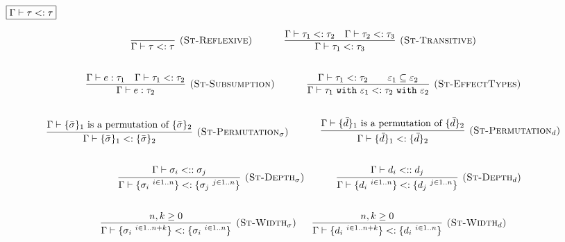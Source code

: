 \documentclass{llncs}
\newcommand{\keywadj}[1]{\mathtt{#1}}
\newcommand{\keyw}[1]{\keywadj{#1}~}
\newcommand{\type}[2]{
	#1~\keyw{with} #2
}
\begin{document}
\noindent
$\fbox{$\Gamma \vdash \tau <: \tau$}$

\[
\begin{array}{c}

\infer[\textsc{(St-Reflexive)}]
	{\Gamma \vdash \tau <: \tau}
	{}
	
~~~~~~~~~~

	\infer[\textsc{(St-Transitive)}]
	{\Gamma \vdash \tau_1 <: \tau_3}
	{\Gamma \vdash \tau_1 <: \tau_2 & \Gamma \vdash \tau_2 <: \tau_3}\\[5ex]

\infer[\textsc{(St-Subsumption)}]
	{\Gamma \vdash e : \tau_2}
	{\Gamma \vdash e : \tau_1 & \Gamma \vdash \tau_1 <: \tau_2} 
	
	~~~~~~~~~~
	
\infer[\textsc{(St-EffectTypes)}]
	{ \Gamma \vdash \type{\tau_1}{\varepsilon_1} <: \type{\tau_2}{\varepsilon_2}}
	{ \Gamma \vdash \tau_1 <: \tau_2 ~~~~~~ \varepsilon_1 \subseteq \varepsilon_2} \\[5ex]

\infer[\textsc{(St-Permutation$_\sigma$)}]
	{\Gamma \vdash \{ \bar \sigma \}_1 <: \{ \bar \sigma \}_2 }
	{\Gamma \vdash \{ \bar \sigma \}_1 $ is a permutation of $ \{ \bar \sigma \}_2}
	
	~~~~~~~~~~
	
\infer[\textsc{(St-Permutation$_d$)}]
	{\Gamma \vdash \{ \bar d \}_1 <: \{ \bar d \}_2 }
	{\Gamma \vdash \{ \bar d \}_1 $ is a permutation of $ \{ \bar d \}_2}
	
	\\[5ex]
	
	~~~~~~~~~~

\infer[\textsc{(St-Depth$_\sigma$)}]
	{ \Gamma \vdash \{ \sigma_i~^{i \in 1..n} \} <: \{ \sigma_j~^{j \in 1..n} \} }
	{ \Gamma \vdash \sigma_i <:: \sigma_j }
	
	~~~~~~~~~~
	
\infer[\textsc{(St-Depth$_d$)}]
	{ \Gamma \vdash \{ d_i~^{i \in 1..n} \} <: \{ d_j~^{j \in 1..n} \} }
	{ \Gamma \vdash d_i <:: d_j }
	
	\\[5ex]
	
\infer[\textsc{(St-Width$_\sigma$)}]
	{ \Gamma \vdash \{ \sigma_i~^{i \in 1..n+k} \} <: \{ \sigma_i~^{i \in 1..n} \} }
	{n,k \geq 0}
	
~~~~~
  
\infer[\textsc{(St-Width$_d$)}]
	{ \Gamma \vdash \{ d_i~^{i \in 1..n+k} \} <: \{ d_i~^{i \in 1..n} \} }
	{n,k \geq 0}
	
		\\[5ex]
	
	
\end{array}
\]
\end{document}
